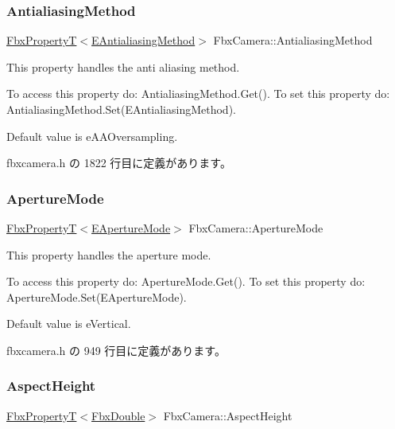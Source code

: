 \subsubsection{\texorpdfstring{Antialiasing\+Method}{AntialiasingMethod}}
{\footnotesize\ttfamily \hyperlink{class_fbx_property_t}{Fbx\+PropertyT}$<$\hyperlink{class_fbx_camera_a44949ea304940f214a2f23a66dcbf45f}{E\+Antialiasing\+Method}$>$ Fbx\+Camera\+::\+Antialiasing\+Method}

This property handles the anti aliasing method.

To access this property do\+: Antialiasing\+Method.\+Get(). To set this property do\+: Antialiasing\+Method.\+Set(\+E\+Antialiasing\+Method).

Default value is e\+A\+A\+Oversampling. 

 fbxcamera.\+h の 1822 行目に定義があります。

\mbox{\label{class_fbx_camera_afa8019b2027da3798e13bb1126c5941d}} 
\subsubsection{\texorpdfstring{Aperture\+Mode}{ApertureMode}}
{\footnotesize\ttfamily \hyperlink{class_fbx_property_t}{Fbx\+PropertyT}$<$\hyperlink{class_fbx_camera_addeea6fc943ce5f087dbc54c142f890e}{E\+Aperture\+Mode}$>$ Fbx\+Camera\+::\+Aperture\+Mode}

This property handles the aperture mode.

To access this property do\+: Aperture\+Mode.\+Get(). To set this property do\+: Aperture\+Mode.\+Set(\+E\+Aperture\+Mode).

Default value is e\+Vertical. 

 fbxcamera.\+h の 949 行目に定義があります。

\mbox{\label{class_fbx_camera_aabeade4a36213c65d7a4f45aeceebff6}} 
\subsubsection{\texorpdfstring{Aspect\+Height}{AspectHeight}}
{\footnotesize\ttfamily \hyperlink{class_fbx_property_t}{Fbx\+PropertyT}$<$\hyperlink{fbxtypes_8h_a171e72a1c46fc15c1a6c9c31948c1c5b}{Fbx\+Double}$>$ Fbx\+Camera\+::\+Aspect\+Height}

